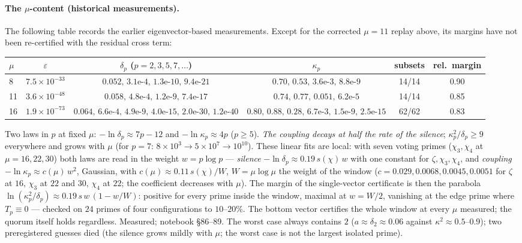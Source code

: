 \documentclass[11pt]{article}
\begin{document}
\paragraph{The $\mu$-content (historical measurements).} The following table records the earlier eigenvector-based measurements. Except for the corrected $\mu=11$ replay above, its margins have not been re-certified with the residual cross term:
\begin{center}\scriptsize
\setlength{\tabcolsep}{2pt}
\begin{tabular}{lccccc}\toprule
$\mu$ & $\varepsilon$ & $\delta_p$ ($p=2,3,5,7,\ldots$) & $\kappa_p$ & subsets & rel.\ margin\\\midrule
8 & $7.5\times10^{-33}$ & $0.052,\,3.1\text{e-}4,\,1.3\text{e-}10,\,9.4\text{e-}21$ & $0.70,\,0.53,\,3.6\text{e-}3,\,8.8\text{e-}9$ & 14/14 & 0.90\\
11 & $3.6\times10^{-48}$ & $0.058,\,4.8\text{e-}4,\,1.2\text{e-}9,\,7.4\text{e-}17$ & $0.74,\,0.77,\,0.051,\,6.2\text{e-}5$ & 14/14 & 0.85\\
16 & $1.9\times10^{-73}$ & $0.064,\,6.6\text{e-}4,\,4.9\text{e-}9,\,4.0\text{e-}15,\,2.0\text{e-}30,\,1.2\text{e-}40$ & $0.80,\,0.88,\,0.28,\,6.7\text{e-}3,\,1.5\text{e-}9,\,2.5\text{e-}15$ & 62/62 & 0.83\\\bottomrule
\end{tabular}
\end{center}
Two laws in $p$ at fixed $\mu$: $-\ln\delta_p\approx7p-12$ and $-\ln\kappa_p\approx4p$ ($p\ge5$). \emph{The coupling decays at half the rate of the silence}; $\kappa_p^2/\delta_p\ge9$ everywhere and grows with $\mu$ (for $p=7$: $8\times10^3\to5\times10^7\to10^{10}$). These linear fits are local: with seven voting primes ($\chi_3,\chi_4$ at $\mu=16,22,30$) both laws are read in the weight $w=p\log p$ --- \emph{silence} $-\ln\delta_p\approx0.19\,s(\chi)\,w$ with one constant for $\zeta,\chi_3,\chi_4$, and \emph{coupling} $-\ln\kappa_p\approx c(\mu)\,w^2$, Gaussian, with $c(\mu)\approx0.11\,s(\chi)/W$, $W=\mu\log\mu$ the weight of the window ($c=0.029,0.0068,0.0045,0.0051$ for $\zeta$ at $16$, $\chi_3$ at $22$ and $30$, $\chi_4$ at $22$; the coefficient decreases with $\mu$). The margin of the single-vector certificate is then the parabola $\ln(\kappa_p^2/\delta_p)\approx0.19\,s\,w\,(1-w/W)$: positive for every prime inside the window, maximal at $w=W/2$, vanishing at the edge prime where $T_p\equiv0$ --- checked on $24$ primes of four configurations to $10$--$20\%$. The bottom vector certifies the whole window at every $\mu$ measured; the quorum itself holds regardless. Measured; notebook \S86--89. The worst case always contains $2$ ($a\approx\delta_2\approx0.06$ against $\kappa^2\approx0.5$--$0.9$); two preregistered guesses died (the silence grows mildly with $\mu$; the worst case is not the largest isolated prime).
\end{document}

